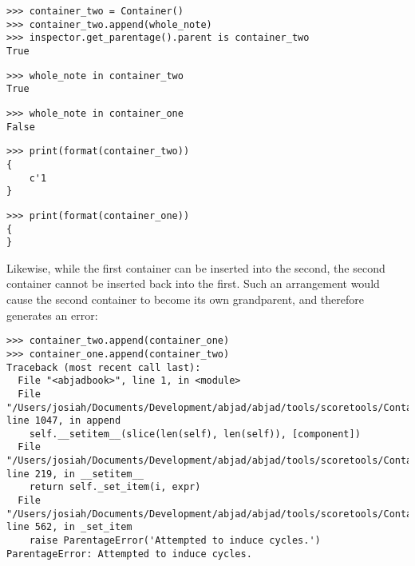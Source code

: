 \begin{comment}
<abjad>
container_two = Container()
container_two.append(whole_note)
inspector.get_parentage().parent is container_two
whole_note in container_two
whole_note in container_one
print(format(container_two))
print(format(container_one))
</abjad>
\end{comment}

\begin{abjadbookoutput}
\begin{singlespacing}
\vspace{-0.5\baselineskip}
\begin{lstlisting}
>>> container_two = Container()
>>> container_two.append(whole_note)
>>> inspector.get_parentage().parent is container_two
True
\end{lstlisting}
\begin{lstlisting}
>>> whole_note in container_two
True
\end{lstlisting}
\begin{lstlisting}
>>> whole_note in container_one
False
\end{lstlisting}
\begin{lstlisting}
>>> print(format(container_two))
{
    c'1
}
\end{lstlisting}
\begin{lstlisting}
>>> print(format(container_one))
{
}
\end{lstlisting}
\end{singlespacing}
\end{abjadbookoutput}

\noindent Likewise, while the first container can be inserted into the second,
the second container cannot be inserted back into the first. Such an
arrangement would cause the second container to become its own grandparent, and
therefore generates an error:

\begin{comment}
<abjad>[allow_exceptions]
container_two.append(container_one)
container_one.append(container_two)
</abjad>
\end{comment}

\begin{abjadbookoutput}
\begin{singlespacing}
\vspace{-0.5\baselineskip}
\begin{lstlisting}
>>> container_two.append(container_one)
>>> container_one.append(container_two)
Traceback (most recent call last):
  File "<abjadbook>", line 1, in <module>
  File "/Users/josiah/Documents/Development/abjad/abjad/tools/scoretools/Container.py", line 1047, in append
    self.__setitem__(slice(len(self), len(self)), [component])
  File "/Users/josiah/Documents/Development/abjad/abjad/tools/scoretools/Container.py", line 219, in __setitem__
    return self._set_item(i, expr)
  File "/Users/josiah/Documents/Development/abjad/abjad/tools/scoretools/Container.py", line 562, in _set_item
    raise ParentageError('Attempted to induce cycles.')
ParentageError: Attempted to induce cycles.
\end{lstlisting}
\end{singlespacing}
\end{abjadbookoutput}

